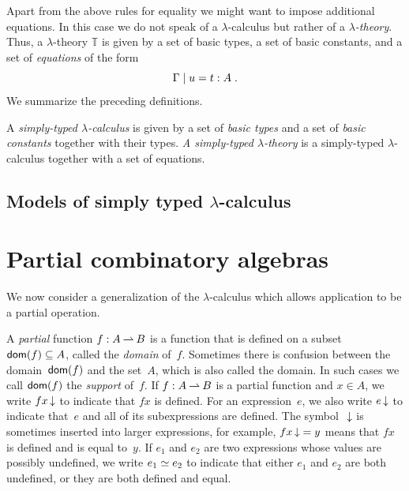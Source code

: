 Apart from the above rules for equality we might want to impose
additional equations. In this case we do not speak of a
$\lambda$-calculus but rather of a \emph{$\lambda$-theory}. Thus, a
$\lambda$-theory $\mathbb{T}$ is given by a set of basic types, a set
of basic constants, and a set of \emph{equations} of the form
%
\begin{equation*}
  \Gamma \mid u = t : A \;.
\end{equation*}
%
We summarize the preceding definitions.

\begin{definition}
  A \emph{simply-typed $\lambda$-calculus} is given by a set of
  \emph{basic types} and a set of \emph{basic constants} together with
  their types.
  \emph{A simply-typed $\lambda$-theory} is a simply-typed
  $\lambda$-calculus together with a set of equations.
\end{definition}

\subsection{Models of simply typed $\lambda$-calculus}
\label{sec:models-typed-lambda-calculus}


\section{Partial combinatory algebras}
\label{sec:pcas}

We now consider a generalization of the $\lambda$-calculus which
allows application to be a partial operation.

A \emph{partial} function $f: A \mathbin{\rightharpoonup} B$ is a function that is
defined on a subset $\mathsf{dom}(f) \subseteq A$, called the \emph{domain}
of~$f$. Sometimes there is confusion between the domain~$\mathsf{dom}(f)$ and
the set~$A$, which is also called the domain. In such cases we call
$\mathsf{dom}(f)$ the \emph{support} of~$f$. If $f: A \mathbin{\rightharpoonup} B$ is a partial
function and $x \in A$, we write $f x \,{\downarrow}$ to indicate that $f x$
is defined. For an expression~$e$, we also write $e \,{\downarrow}$ to
indicate that~$e$ and all of its subexpressions are defined. The
symbol~$\,{\downarrow}$ is sometimes inserted into larger expressions, for
example, $f x \,{\downarrow} = y$ means that $f x$ is defined and is equal
to~$y$. If $e_1$ and $e_2$ are two expressions whose values are
possibly undefined, we write $e_1 \simeq e_2$ to indicate that either
$e_1$ and $e_2$ are both undefined, or they are both defined and
equal.


